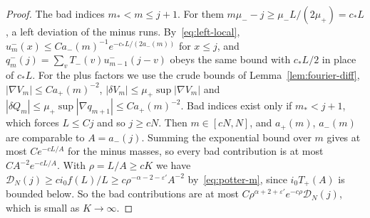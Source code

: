 \begin{proof}
The bad indices $m_*<m\le j+1$. For them $m\mu_\minus-j\ge\mu_\minus L/(2\mu_\plus)=c_*L$, a left
deviation of the minus runs. By~\eqref{eq:left-local}, $u^\minus_m(x)\le Ca_\minus(m)^{-1}e^{-c_*L/(2a_\minus(m))}$
for $x\le j$, and $q^\minus_m(j)=\sum_vT_\minus(v)u^\minus_{m-1}(j-v)$ obeys the same bound with
$c_*L/2$ in place of $c_*L$. For the plus factors we use the crude bounds of
Lemma~\ref{lem:fourier-diff}, $|\nabla V_m|\le Ca_\plus(m)^{-2}$,
$|\delta V_m|\le\mu_\plus\sup|\nabla V_m|$ and $|\delta Q_m|\le\mu_\plus\sup|\nabla q_{m+1}|\le Ca_\plus(m)^{-2}$.
Bad indices exist only if $m_*<j+1$, which forces $L\le Cj$ and so $j\ge cN$. Then
$m\in[cN,N]$, and $a_\plus(m)$, $a_\minus(m)$ are comparable to $A=a_\minus(j)$. Summing the
exponential bound over $m$ gives at most $Ce^{-cL/A}$ for the minus masses, so every bad
contribution is at most $CA^{-2}e^{-cL/A}$. With $\rho=L/A\ge cK$ we have
$\mathcal D_N(j)\ge ci_0f(L)/L\ge c\rho^{-\alpha-2-\varepsilon'}A^{-2}$ by~\eqref{eq:potter-m},
since $i_0T_\plus(A)$ is bounded below. So the bad contributions are at most
$C\rho^{\alpha+2+\varepsilon'}e^{-c\rho}\mathcal D_N(j)$, which is small as $K\to\infty$.


\end{proof}
